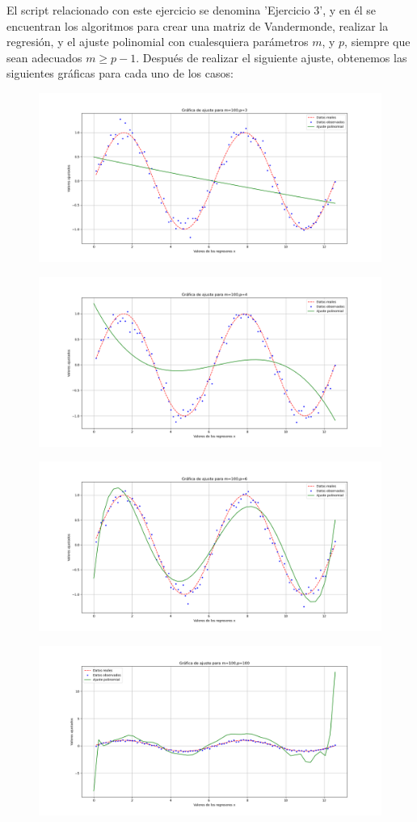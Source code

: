 \documentclass[letterpaper]{article}
\newcommand{\1}{\mathds{1}}
\theoremstyle{definition}
\theoremstyle{definition}
\theoremstyle{definition}
\theoremstyle{definition}
\theoremstyle{definition}
\begin{document}
\begin{enumerate}
    El script relacionado con este ejercicio se denomina 'Ejercicio 3', y en él se encuentran los algoritmos para crear
    una matriz de Vandermonde, realizar la regresión, y el ajuste polinomial con cualesquiera parámetros $m$, y $p$, siempre que
    sean adecuados $m\geq p-1$. Después de realizar el siguiente ajuste, obtenemos las siguientes gráficas para cada uno de los 
    casos:

    \begin{figure}[h]
        \centering
        \includegraphics[width=0.7\linewidth]{1.png}
        \caption{}
    \end{figure}
    \begin{figure}[h]
        \centering
        \includegraphics[width=0.7\linewidth]{2.png}
        \caption{}
    \end{figure}  
    \begin{figure}[h]
        \centering
        \includegraphics[width=0.7\linewidth]{3.png}
        \caption{}
    \end{figure}  
    \begin{figure}[h]
        \centering
        \includegraphics[width=0.7\linewidth]{4.png}

\end{figure}
\end{enumerate}
\end{document}
